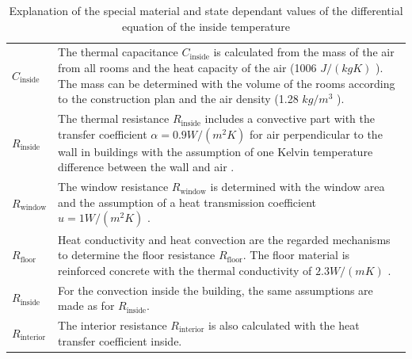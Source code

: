     \begin{table}[H]
        \centering
        \begin{tabular}{l p{13cm}}
            $C_\text{inside}$ & The thermal capacitance $C_\text{inside}$ is calculated from the mass of the air from all rooms and the heat capacity of the air (1006 $J/(kg K)$ \cite{Weigand.2016}). The mass can be determined with the volume of the rooms according to the construction plan \cite{Bauplan} and the air density (1.28 $kg/m^3$ \cite{Weigand.2016}).\\
            $R_\text{inside}$ & The thermal resistance $R_\text{inside}$ includes a convective part with the transfer coefficient $\alpha = 0.9 W/(m^2 K)$ for air perpendicular to the wall in buildings with the assumption of one Kelvin temperature difference between the wall and air \cite{Schweizer-fnalpha}.\\
            $R_\text{window}$ & The window resistance $R_\text{window}$ is determined with the window area and the assumption of a heat transmission coefficient $u = 1 W/(m^2 K)$ \cite{ThorbenFrahm.2021}.\\
            $R_\text{floor}$ & Heat conductivity and heat convection are the regarded mechanisms to determine the floor resistance $R_\text{floor}$. The floor material is reinforced concrete with the thermal conductivity of $2.3 W/(m K)$ \cite{AntonSchweizer.12.10.2021}.\\
            $R_\text{inside}$ & For the convection inside the building, the same assumptions are made as for $R_\text{inside}$.\\
            $R_\text{interior}$ & The interior resistance $R_\text{interior}$ is also calculated with the heat transfer coefficient inside.
        \end{tabular}
        \caption{Explanation of the special material and state dependant values of the differential equation of the inside temperature}
        \label{tab:valuesOfInsideTemperature}
    \end{table}
    
